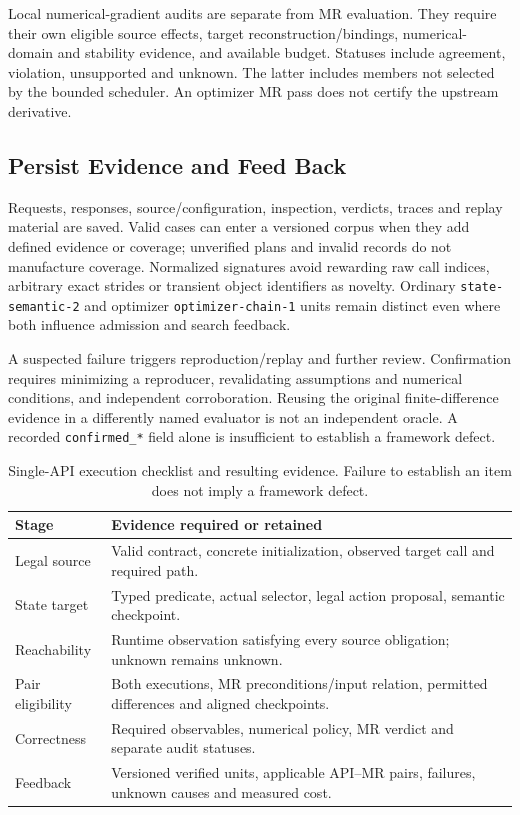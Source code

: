 \documentclass[conference]{IEEEtran}
\begin{document}
Local numerical-gradient audits are separate from MR evaluation. They require their own eligible source effects, target reconstruction/bindings, numerical-domain and stability evidence, and available budget. Statuses include agreement, violation, unsupported and unknown. The latter includes members not selected by the bounded scheduler. An optimizer MR pass does not certify the upstream derivative.

\subsection{Persist Evidence and Feed Back}
Requests, responses, source/configuration, inspection, verdicts, traces and replay material are saved. Valid cases can enter a versioned corpus when they add defined evidence or coverage; unverified plans and invalid records do not manufacture coverage. Normalized signatures avoid rewarding raw call indices, arbitrary exact strides or transient object identifiers as novelty. Ordinary \texttt{state-semantic-2} and optimizer \texttt{optimizer-chain-1} units remain distinct even where both influence admission and search feedback.

A suspected failure triggers reproduction/replay and further review. Confirmation requires minimizing a reproducer, revalidating assumptions and numerical conditions, and independent corroboration. Reusing the original finite-difference evidence in a differently named evaluator is not an independent oracle. A recorded \texttt{confirmed\_*} field alone is insufficient to establish a framework defect.

\begin{table}[t]
\caption{Single-API execution checklist and resulting evidence. Failure to establish an item does not imply a framework defect.}
\label{tab:procedure}
\centering\small
\begin{tabular}{p{}p{}}
\toprule
Stage & Evidence required or retained\\\midrule
Legal source & Valid contract, concrete initialization, observed target call and required path.\\
State target & Typed predicate, actual selector, legal action proposal, semantic checkpoint.\\
Reachability & Runtime observation satisfying every source obligation; unknown remains unknown.\\
Pair eligibility & Both executions, MR preconditions/input relation, permitted differences and aligned checkpoints.\\
Correctness & Required observables, numerical policy, MR verdict and separate audit statuses.\\
Feedback & Versioned verified units, applicable API--MR pairs, failures, unknown causes and measured cost.\\\bottomrule
\end{tabular}
\end{table}
\end{document}
